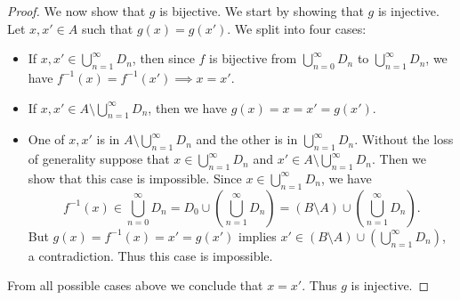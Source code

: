 \begin{proof}
  We now show that \(g\) is bijective.
  We start by showing that \(g\) is injective.
  Let \(x, x' \in A\) such that \(g(x) = g(x')\).
  We split into four cases:
  \begin{itemize}
    \item If \(x, x' \in \bigcup_{n = 1}^\infty D_n\), then since \(f\) is bijective from \(\bigcup_{n = 0}^\infty D_n\) to \(\bigcup_{n = 1}^\infty D_n\), we have \(f^{-1}(x) = f^{-1}(x') \implies x = x'\).
    \item If \(x, x' \in A \setminus \bigcup_{n = 1}^\infty D_n\), then we have \(g(x) = x = x' = g(x')\).
    \item One of \(x, x'\) is in \(A \setminus \bigcup_{n = 1}^\infty D_n\) and the other is in \(\bigcup_{n = 1}^\infty D_n\).
          Without the loss of generality suppose that \(x \in \bigcup_{n = 1}^\infty D_n\) and \(x' \in A \setminus \bigcup_{n = 1}^\infty D_n\).
          Then we show that this case is impossible.
          Since \(x \in \bigcup_{n = 1}^\infty D_n\), we have
          \[
            f^{-1}(x) \in \bigcup_{n = 0}^\infty D_n = D_0 \cup (\bigcup_{n = 1}^\infty D_n) = (B \setminus A) \cup (\bigcup_{n = 1}^\infty D_n).
          \]
          But \(g(x) = f^{-1}(x) = x' = g(x')\) implies \(x' \in (B \setminus A) \cup (\bigcup_{n = 1}^\infty D_n)\), a contradiction.
          Thus this case is impossible.
  \end{itemize}
  From all possible cases above we conclude that \(x = x'\).
  Thus \(g\) is injective.


\end{proof}
